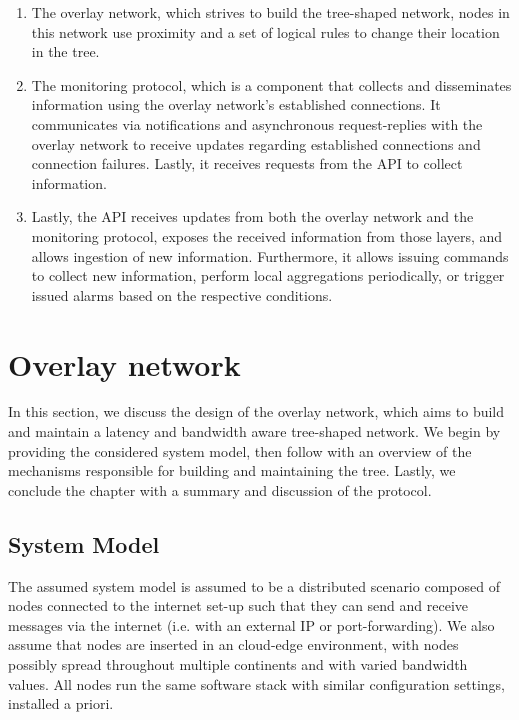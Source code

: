 \begin{enumerate}
    \item The overlay network, which strives to build the tree-shaped network, nodes in this network use proximity and a set of logical rules to change their location in the tree.

    \item The monitoring protocol, which is a component that collects and disseminates information using the overlay network's established connections. It communicates via notifications and asynchronous request-replies with the overlay network to receive updates regarding established connections and connection failures. Lastly, it receives requests from the API to collect information.

    \item Lastly, the API receives updates from both the overlay network and the monitoring protocol, exposes the received information from those layers, and allows ingestion of new information. Furthermore, it allows issuing commands to collect new information, perform local aggregations periodically, or trigger issued alarms based on the respective conditions.
\end{enumerate}

\section{Overlay network}

In this section, we discuss the design of the overlay network, which aims to build and maintain a latency and bandwidth aware tree-shaped network. We begin by providing the considered system model, then follow with an overview of the mechanisms responsible for building and maintaining the tree. Lastly, we conclude the chapter with a summary and discussion of the protocol.

\subsection{System Model}

The assumed system model is assumed to be a distributed scenario composed of nodes connected to the internet set-up such that they can send and receive messages via the internet (i.e. with an external IP or port-forwarding). We also assume that nodes are inserted in an cloud-edge environment, with nodes possibly spread throughout multiple continents and with varied bandwidth values. All nodes run the same software stack with similar configuration settings, installed a priori.

